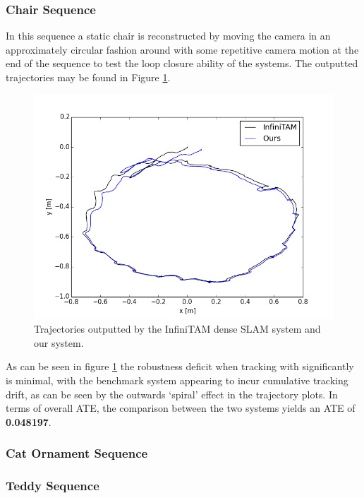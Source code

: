 \subsubsection{Chair Sequence}
In this sequence a static chair is reconstructed by moving the camera in an approximately circular fashion around with some repetitive camera motion at the end of the sequence to test 
the loop closure ability of the systems. The outputted trajectories may be found in Figure \ref{chairTrajectory}.
\begin{figure}[h]
	\centering
	\includegraphics[scale=0.25]{plots/chairTrajectories.png}
	\caption{Trajectories outputted by the InfiniTAM dense SLAM system and our system.}
	\label{chairTrajectory}
\end{figure}
As can be seen in figure \ref{chairTrajectory} the robustness deficit when tracking with significantly is minimal, with the benchmark system appearing to incur cumulative tracking drift, as can be seen 
by the outwards `spiral' effect in the trajectory plots. In terms of overall ATE, the comparison between the two systems yields an ATE of \textbf{0.048197}.

\subsubsection{Cat Ornament Sequence}
%

\subsubsection{Teddy Sequence}